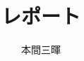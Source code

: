 \documentclass[titlepage,a4paper]{jsarticle}
\title{レポート}
\author{本間三暉}
\begin{document}
\maketitle

\begin{thebibliography}{99}
  \bibitem{}
\end{thebibliography}
\end{document}
